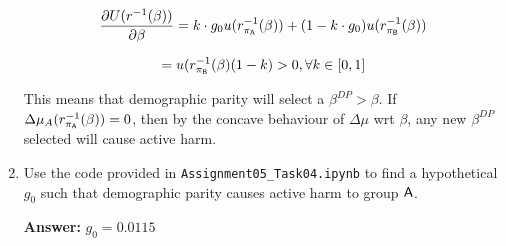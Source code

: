 \begin{enumerate}
    $$ \frac{\partial U(r^{-1}(\beta))}{\partial \beta} = k \cdot g_0 u(r^{-1}_{\pi_{\mathsf{A}}}(\beta)) + (1 - k \cdot g_0) u(r^{-1}_{\pi_{\mathsf{B}}}(\beta)) $$

    $$ =  u(r^{-1}_{\pi_{\mathsf{B}}}(\beta) (1 - k) > 0, \forall k \in [0, 1] $$

    This means that demographic parity will select a $\beta^{DP} > \beta$. If $\Delta \mu_A(r^{-1}_{\pi_{\mathsf{A}}}(\beta)) = 0$, then by the concave behaviour of $\Delta \mu$ wrt $\beta$, any new $\beta^{DP}$ selected will cause active harm.
	

	\item Use the code provided in  \texttt{Assignment05\_Task04.ipynb} to find a hypothetical $g_0$ such that demographic parity causes active harm to group $\mathsf{A}$.
	
	
	\textbf{Answer:} $g_0 = 0.0115$
\end{enumerate}


